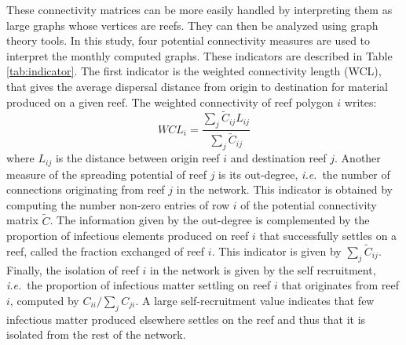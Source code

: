 \documentclass[utf8]{frontiersSCNS}
\newcommand{\ie}{{\it i.e.}\ }
\begin{document}
These connectivity matrices can be more easily handled by interpreting them as large graphs whose vertices are reefs. They can then be analyzed using graph theory tools. In this study, four potential connectivity measures are used to interpret the monthly computed graphs. These indicators are described in Table \ref{tab:indicator}. The first indicator is the weighted connectivity length (WCL), that gives the average dispersal distance from origin to destination for material produced on a given reef. The weighted connectivity of reef polygon $i$ writes:
\begin{equation}
    WCL_i = \dfrac{\sum_j \tilde{C}_{ij} L_{ij}}{\sum_j \tilde{C}_{ij}}
\end{equation}
where $L_{ij}$ is the distance between origin reef $i$ and destination reef $j$. Another measure of the spreading potential of reef $j$ is its out-degree, \ie the number of connections originating from reef $j$ in the network. This indicator is obtained by computing the number non-zero entries of row $i$ of the potential connectivity matrix $\tilde{C}$. The information given by the out-degree is complemented by the proportion of infectious elements produced on reef $i$ that successfully settles on a reef, called the fraction exchanged of reef $i$. This indicator is given by $\sum_{j} \tilde{C}_{ij}$. Finally, the isolation of reef $i$ in the network is given by the self recruitment, \ie the proportion of infectious matter settling on reef $i$ that originates from reef $i$, computed by $C_{ii}/\sum_jC_{ji}$. A large self-recruitment value indicates that few infectious matter produced elsewhere settles on the reef and thus that it is isolated from the rest of the network. 
\end{document}
